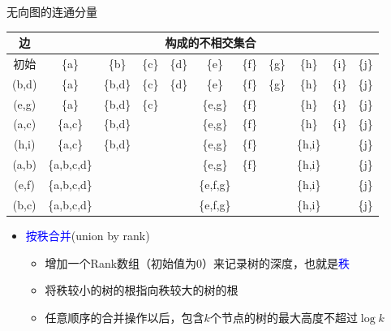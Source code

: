 \begin{frame}{无向图的连通分量}
    \begin{table}
        \begin{tabular}{c|c|c|c|c|c|c|c|c|c|c}
            边   & \multicolumn{10}{c}{构成的不相交集合} \\\hline
            初始     & \{a\}         & \{b\}   & \{c\}  & \{d\}  & \{e\}     & \{f\}  & \{g\}  & \{h\}   & \{i\}  & \{j\}  \\\hline
            (b,d)   & \{a\}         & \{b,d\} & \{c\}  & \{d\}  & \{e\}     & \{f\}  & \{g\}  & \{h\}   & \{i\}  & \{j\}   \\\hline
            (e,g)   & \{a\}         & \{b,d\} & \{c\}  &      & \{e,g\}   & \{f\}  &      & \{h\}   & \{i\}  & \{j\}   \\\hline
            (a,c)   & \{a,c\}        & \{b,d\} &      &      & \{e,g\}   & \{f\}  &      & \{h\}   & \{i\}  & \{j\}   \\\hline
            (h,i)   & \{a,c\}        & \{b,d\} &      &      & \{e,g\}   & \{f\}  &      & \{h,i\} &      & \{j\}   \\\hline
            (a,b)   & \{a,b,c,d\}    &       &      &      & \{e,g\}   & \{f\}  &      & \{h,i\} &      & \{j\}   \\\hline
            (e,f)   & \{a,b,c,d\}    &       &      &      & \{e,f,g\} &      &      & \{h,i\} &      & \{j\}   \\\hline
            (b,c)   & \{a,b,c,d\}    &       &      &      & \{e,f,g\} &      &      & \{h,i\} &      & \{j\}   \\\hline
        \end{tabular}
    \end{table}
\end{frame}
\begin{itemize}
    \item \textcolor{blue}{按秩合并}(union by rank)
    \begin{itemize}
        \item 增加一个Rank数组（初始值为0）来记录树的深度，也就是\textcolor{blue}{秩}
        \item 将秩较小的树的根指向秩较大的树的根
        \item 任意顺序的合并操作以后，包含$k$个节点的树的最大高度不超过$\log k$
    \end{itemize} 
\end{itemize}
